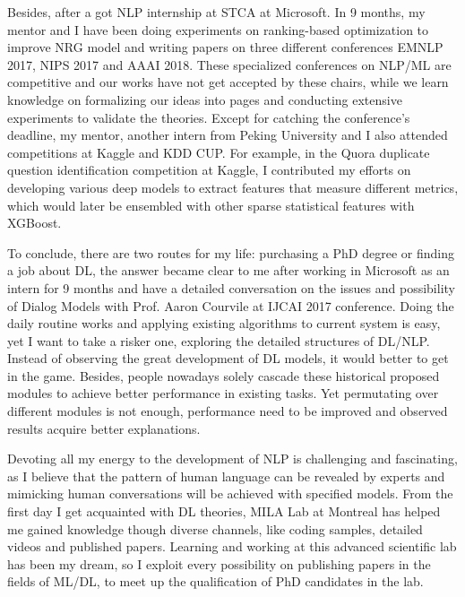 \documentclass{article}
\begin{document}
Besides, after a got NLP internship at STCA at Microsoft. In 9 months, my mentor and I have been doing experiments on ranking-based optimization to improve NRG model and writing papers on three different conferences EMNLP 2017, NIPS 2017 and AAAI 2018. These specialized conferences on NLP/ML are competitive and our works have not get accepted by these chairs, while we learn knowledge on formalizing our ideas into pages and conducting extensive experiments to validate the theories. Except for catching the conference's deadline, my mentor, another intern from Peking University and I also attended competitions at Kaggle and KDD CUP. For example, in the Quora duplicate question identification competition at Kaggle, I contributed my efforts on developing various deep models to extract features that measure different metrics, which would later be ensembled with other sparse statistical features with XGBoost.


To conclude, there are two routes for my life: purchasing a PhD degree or finding a job about DL, the answer became clear to me after working in Microsoft as an intern for 9 months and have a detailed conversation on the issues and possibility of Dialog Models with Prof. Aaron Courvile at IJCAI 2017 conference. Doing the daily routine works and applying existing algorithms to current system is easy, yet I want to take a risker one, exploring the detailed structures of DL/NLP. Instead of observing the great development of DL models, it would better to get in the game. Besides, people nowadays solely cascade these historical proposed modules to achieve better performance in existing tasks. Yet permutating over different modules is not enough, performance need to be improved and observed results acquire better explanations.

Devoting all my energy to the development of NLP is challenging and fascinating, as I believe that the pattern of human language can be revealed by experts and mimicking human conversations will be achieved with specified models. From the first day I get acquainted with DL theories, MILA Lab at Montreal has helped me gained knowledge though diverse channels, like coding samples, detailed videos and published papers. Learning and working at this advanced scientific lab has been my dream, so I exploit every possibility on publishing papers in the fields of ML/DL, to meet up the qualification of PhD candidates in the lab.
\end{document}
